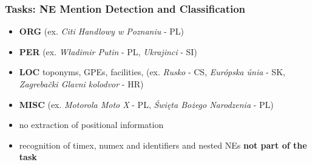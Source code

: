 \documentclass{beamer}
\begin{document}
\begin{frame}
 \frametitle{Tasks: NE Mention Detection and Classification}

\begin{itemize}

\item \textbf{ORG} (ex. {\color{blue}\textit{Citi Handlowy w Poznaniu}} - PL)

\vspace{0.2cm}

\item \textbf{PER} (ex. {\color{blue}\textit{Władimir Putin}} - PL, {\color{blue}\textit{Ukrajinci}} - SI)

\vspace{0.2cm}

\item \textbf{LOC} toponyms, GPEs, facilities, (ex. {\color{blue}\textit{Rusko}} - CS, {\color{blue}\textit{Európska únia}} - SK, {\color{blue}\textit{Zagrebački Glavni kolodvor}} - HR)

\vspace{0.2cm}

\item \textbf{MISC} (ex. {\color{blue}\textit{Motorola Moto X}} - PL, {\color{blue}\textit{Święta Bożego Narodzenia}} - PL)

\vspace{0.2cm}

\item no extraction of positional information

\vspace{0.2cm}

\item recognition of timex, numex and identifiers and nested NEs \textbf{not part of the task}

\end{itemize}

\end{frame}
\end{document}
